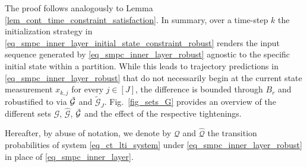 \documentclass{IEEEtran}
\begin{document}
The proof follows analogously to Lemma \ref{lem_cont_time_constraint_satisfaction}. In summary, over a time-step $k$ the initialization strategy in \eqref{eq_smpc_inner_layer_initial_state_constraint_robust} renders the input sequence generated by \eqref{eq_smpc_inner_layer_robust} agnostic to the specific initial state within a partition. While this leads to trajectory predictions in \eqref{eq_smpc_inner_layer_robust} that do not necessarily begin at the current state measurement $x_{k,j}$ for every $j\in[J]$, the difference is bounded through $B_r$ and robustified to via $\Tilde{\mathcal{G}}$ and $\tilde{\mathcal{G}}_J$. Fig.~\ref{fig_sets_G} provides an overview of the different sets $\mathcal{G}$, $\hat{\mathcal{G}}$, $\Tilde{\mathcal{G}}$ and the effect of the respective tightenings. 

Hereafter, by abuse of notation, we denote by $\mathcal{Q}$ and $\hat{\mathcal{Q}}$ the transition probabilities of system \eqref{eq_ct_lti_system} under \eqref{eq_smpc_inner_layer_robust} in place of \eqref{eq_smpc_inner_layer}. 





\end{document}
